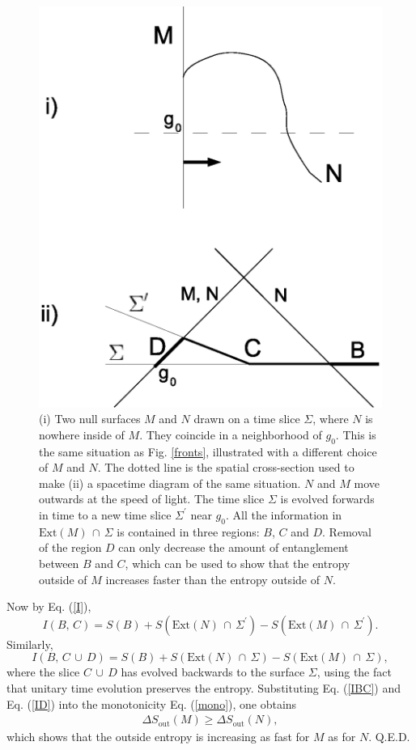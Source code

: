 \documentclass{article}
\begin{document}
\begin{figure}[phtb]
\centering
\includegraphics[width=.8\textwidth]{lemmaC.eps}
\caption{\small{
(i) Two null surfaces $M$ and $N$ drawn on a time slice $\Sigma$, where $N$ is nowhere inside of $M$.  They coincide in a neighborhood of $g_0$.  This is the same situation as Fig. \ref{fronts}, illustrated with a different choice of $M$ and $N$.  The dotted line is the spatial cross-section used to make (ii) a spacetime diagram of the same situation.  $N$ and $M$ move outwards at the speed of light.  The time slice $\Sigma$ is evolved forwards in time to a new time slice $\Sigma^\prime$ near $g_0$.  All the information in $\mathrm{Ext}(M)\,\cap\,\Sigma$ is contained in three regions: $B$, $C$ and $D$.  Removal of the region $D$ can only decrease the amount of entanglement between $B$ and $C$, which can be used to show that the entropy outside of $M$ increases faster than the entropy outside of $N$.
}}\label{lemmaC}
\end{figure}

Now by Eq. (\ref{I}),
\begin{equation}\label{IBC}
I(B,\,C) = S(B) + S(\mathrm{Ext}(N)\,\cap\,\Sigma^\prime) - S(\mathrm{Ext}(M)\,\cap\,\Sigma^\prime).
\end{equation}
Similarly,
\begin{equation}\label{ID}
I(B,\,C\,\cup\,D) = S(B) + S(\mathrm{Ext}(N)\,\cap\,\Sigma) - S(\mathrm{Ext}(M)\,\cap\,\Sigma),
\end{equation}
where the slice $C\,\cup\,D$ has evolved backwards to the surface $\Sigma$, using the fact that unitary time evolution preserves the entropy.  Substituting Eq. (\ref{IBC}) and Eq. (\ref{ID}) into the monotonicity Eq. (\ref{mono}), one obtains
\begin{eqnarray}\label{Smono}
\Delta S_\mathrm{out}(M) \ge \Delta S_\mathrm{out}(N),
\end{eqnarray}
which shows that the outside entropy is increasing as fast for $M$ as for $N$.  Q.E.D.
\end{document}

